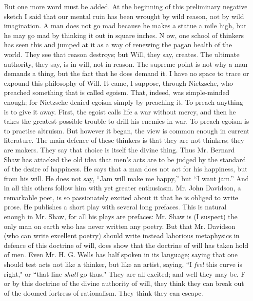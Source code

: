 \documentclass{book}
\begin{document}
But one more word must be added. At the beginning of this preliminary negative sketch I said that our mental ruin has been wrought by wild reason, not by wild imagination. A man does not go mad because he makes a statue a mile high, but he may go mad by thinking it out in square inches. N ow, one school of thinkers has seen this and jumped at it as a way of renewing the pagan health of the world. They see that reason destroys; but Will, they say, creates. The ultimate authority, they say, is in will, not in reason. The supreme point is not why a man demands a thing, but the fact that he does demand it. I have no space to trace or expound this philosophy of Will. It came, I suppose, through Nietzsche, who preached something that is called egoism. That, indeed, was simple-minded enough; for Nietzsche denied egoism simply by preaching it. To preach anything is to give it away. First, the egoist calls life a war without mercy, and then he takes the greatest possible trouble to drill his enemies in war. To preach egoism is to practise altruism. But however it began, the view is common enough in current literature. The main defence of these thinkers is that they are not thinkers; they are makers. They say that choice is itself the divine thing. Thus Mr. Bernard Shaw has attacked the old idea that men’s acts are to be judged by the standard of the desire of happiness. He says that a man does not act for his happiness, but from his will. He does not say, “Jam will make me happy,” but “I want jam.” And in all this others follow him with yet greater enthusiasm. Mr. John Davidson, a remarkable poet, is so passionately excited about it that he is obliged to write prose. He publishes a short play with several long prefaces. This is natural enough in Mr. Shaw, for all his plays are prefaces: Mr. Shaw is (I suspect) the only man on earth who has never written any poetry. But that Mr. Davidson (who can write excellent poetry) should write instead laborious metaphysics in defence of this doctrine of will, does show that the doctrine of will has taken hold of men. Even Mr. H. G. Wells has half spoken in its language; saying that one should test acts not like a thinker, but like an artist, saying, “I \emph{feel} this curve is right," or “that line \emph{shall} go thus." They are all excited; and well they may be. F or by this doctrine of the divine authority of will, they think they can break out of the doomed fortress of rationalism. They think they can escape.
\end{document}
